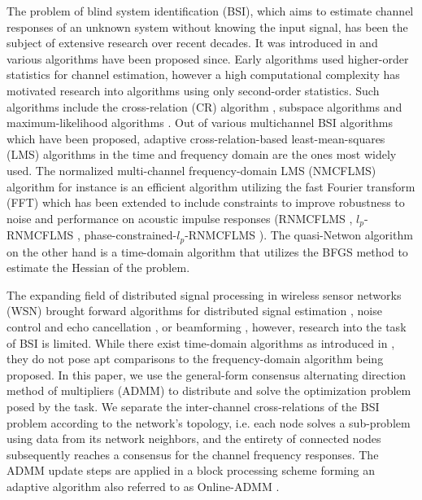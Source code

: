 \documentclass{article}
\begin{document}
The problem of blind system identification (BSI), which aims to estimate channel responses of an unknown system without knowing the input signal, has been the subject of extensive research over recent decades.
It was introduced in \cite{satoMethodSelfRecoveringEqualization1975} and various algorithms have been proposed since.
Early algorithms used higher-order statistics \cite{godardSelfRecoveringEqualizationCarrier1980,tongNewApproachBlind1991,mendelTutorialHigherorderStatistics1991} for channel estimation, however a high computational complexity has motivated research into algorithms using only second-order statistics.
Such algorithms include the cross-relation (CR) algorithm \cite{langtongBlindIdentificationEqualization1994, guanghanxuLeastsquaresApproachBlind1995}, subspace algorithms \cite{moulinesSubspaceMethodsBlind1995,gannotSubspaceMethodsMultimicrophone2003,diamantarasEfficientSubspaceMethod2008,mayyalaStructureBasedSubspaceMethod2017} and maximum-likelihood algorithms \cite{yingbohuaFastMaximumLikelihood1996}.
Out of various multichannel BSI algorithms which have been proposed, adaptive cross-relation-based least-mean-squares (LMS) algorithms in the time and frequency domain are the ones most widely used.
The normalized multi-channel frequency-domain LMS (NMCFLMS) \cite{huangAdaptiveMultichannelLeast2002,huangClassFrequencydomainAdaptive2003} algorithm for instance is an efficient algorithm utilizing the fast Fourier transform (FFT) which has been extended to include constraints to improve robustness to noise and performance on acoustic impulse responses (RNMCFLMS \cite{huNoiseRobustBlind2015}, \(l_p\)-RNMCFLMS \cite{heNoiseRobustFrequencyDomain2018}, phase-constrained-\(l_p\)-RNMCFLMS \cite{joRobustBlindMultichannel2021}).
The quasi-Netwon algorithm \cite{habetsOnlineQuasiNewtonAlgorithm2010} on the other hand is a time-domain algorithm that utilizes the BFGS method to estimate the Hessian of the problem.

The expanding field of distributed signal processing in wireless sensor networks (WSN) brought forward algorithms for distributed signal estimation \cite{5483092}, noise control and echo cancellation \cite{9670697}, or beamforming \cite{6663655,9670697}, however, research into the task of BSI is limited.
While there exist time-domain algorithms as introduced in \cite{yuDistributedBlindSystem2014,liuDistributedBlindIdentification2016,liuDistributedRecursiveBlind2017}, they do not pose apt comparisons to the frequency-domain algorithm being proposed.
In this paper, we use the general-form consensus alternating direction method of multipliers (ADMM) \cite{boydDistributedOptimizationStatistical2011} to distribute and solve the optimization problem posed by the task.
We separate the inter-channel cross-relations of the BSI problem according to the network's topology, i.e. each node solves a sub-problem using data from its network neighbors, and the entirety of connected nodes subsequently reaches a consensus for the channel frequency responses.
The ADMM update steps are applied in a block processing scheme forming an adaptive algorithm also referred to as Online-ADMM \cite{wangOnlineAlternatingDirection2013,hosseiniOnlineDistributedADMM2014}.
\end{document}
